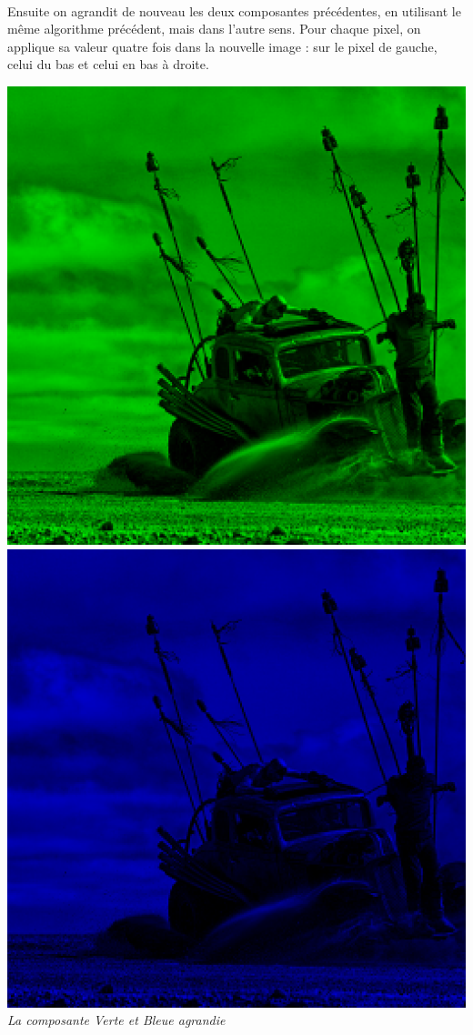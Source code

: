 \documentclass[a4paper,11pt]{article}
\begin{document}
\paragraph{} Ensuite on agrandit de nouveau les deux composantes précédentes, en utilisant le même algorithme précédent, mais dans l'autre sens. Pour chaque pixel, on applique sa valeur quatre fois dans la nouvelle image : sur le pixel de gauche, celui du bas et celui en bas à droite.

\begin{center}
\includegraphics[scale=0.5]{./imgs/madmax3G.png}
\includegraphics[scale=0.5]{./imgs/madmax3B.png}\\
\textit{La composante Verte et Bleue agrandie}
\end{center}
\end{document}
